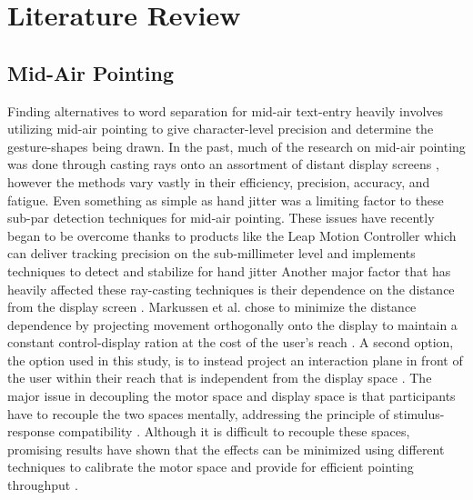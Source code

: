 \chapter{Literature Review}

\section{Mid-Air Pointing}
Finding alternatives to word separation for mid-air text-entry heavily involves utilizing mid-air pointing to give character-level precision and determine the gesture-shapes being drawn. In the past, much of the research on mid-air pointing was done through casting rays onto an assortment of distant display screens \cite{ref_large_display_pointing,ref_air_pointing,ref_ray_pointing_large_displays,ref_shadow_reaching,ref_freehand_pointing_large_displays,ref_large_screen_pointing_gestures}, however the methods vary vastly in their efficiency, precision, accuracy, and fatigue. Even something as simple as hand jitter was a limiting factor to these sub-par detection techniques for mid-air pointing. These issues have recently began to be overcome thanks to products like the Leap Motion Controller which can deliver tracking precision on the sub-millimeter level and implements techniques to detect and stabilize for hand jitter \cite{ref_leap_device_evaluation_1,ref_leap_device_evaluation_2} Another major factor that has heavily affected these ray-casting techniques is their dependence on the distance from the display screen \cite{ref_mid_air_text_large_displays}. Markussen et al. chose to minimize the distance dependence by projecting movement orthogonally onto the display to maintain a constant control-display ration at the cost of the user's reach \cite{ref_selection_based_mid_air}. A second option, the option used in this study, is to instead project an interaction plane in front of the user within their reach that is independent from the display space \cite{ref_alvin_thesis,ref_darren_thesis,ref_leap_pointing_device}. The major issue in decoupling the motor space and display space is that participants have to recouple the two spaces mentally, addressing the principle of stimulus-response compatibility \cite{ref_vulture,ref_stimulus_response_compatibility}. Although it is difficult to recouple these spaces, promising results have shown that the effects can be minimized using different techniques to calibrate the motor space and provide for efficient pointing throughput \cite{ref_alvin_thesis,ref_darren_thesis}.

